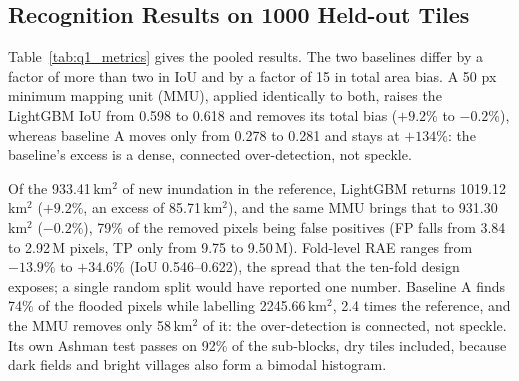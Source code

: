 \subsection{Recognition Results on 1000 Held-out Tiles}

Table~\ref{tab:q1_metrics} gives the pooled results. The two baselines differ by a factor of more than two in IoU and by a factor of 15 in total area bias. A 50 px minimum mapping unit (MMU), applied identically to both, raises the LightGBM IoU from 0.598 to 0.618 and removes its total bias ($+9.2\%$ to $-0.2\%$), whereas baseline A moves only from 0.278 to 0.281 and stays at $+134\%$: the baseline's excess is a dense, connected over-detection, not speckle.

\begin{table}[!ht]
\centering
\caption{Problem 1 recognizers with and without the MMU}
\label{tab:q1_metrics}
\end{table}

Of the 933.41\,km$^2$ of new inundation in the reference, LightGBM returns 1019.12\,km$^2$ ($+9.2\%$, an excess of 85.71\,km$^2$), and the same MMU brings that to 931.30\,km$^2$ ($-0.2\%$), 79\% of the removed pixels being false positives (FP falls from 3.84 to 2.92\,M pixels, TP only from 9.75 to 9.50\,M). Fold-level RAE ranges from $-13.9\%$ to $+34.6\%$ (IoU 0.546--0.622), the spread that the ten-fold design exposes; a single random split would have reported one number. Baseline A finds 74\% of the flooded pixels while labelling 2245.66\,km$^2$, 2.4 times the reference, and the MMU removes only 58\,km$^2$ of it: the over-detection is connected, not speckle. Its own Ashman test passes on 92\% of the sub-blocks, dry tiles included, because dark fields and bright villages also form a bimodal histogram.


